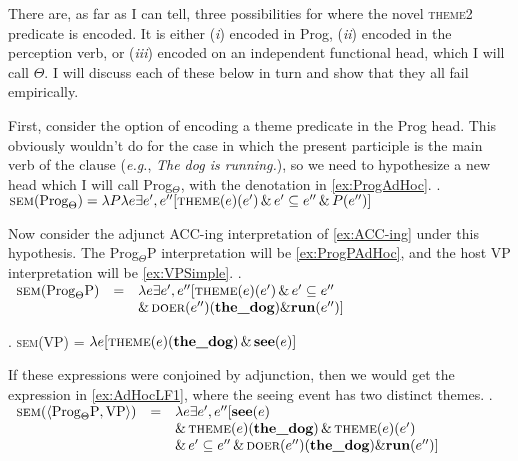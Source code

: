 There are, as far as I can tell, three possibilities for where the novel \textsc{theme2} predicate is encoded.
It is either (\textit{i}) encoded in Prog, (\textit{ii}) encoded in the perception verb, or (\textit{iii}) encoded on an independent functional head, which I will call $\Theta$.
I will discuss each of these below in turn and show that they all fail empirically.

First, consider the option of encoding a theme predicate in the Prog head.
This obviously wouldn't do for the case in which the present participle is the main verb of the clause (\textit{e.g.}, \textit{The dog is running.}), so we need to hypothesize a new head which I will call Prog$_{\Theta}$, with the denotation in \cref{ex:ProgAdHoc}.
\ex.\label{ex:ProgAdHoc} $\textsc{sem}(\text{Prog}_{\Theta}) = \lambda P \lambda e \exists e^{\prime},e^{\prime\prime}[\textsc{theme}(e)(e^{\prime}) \,\&\, e^{\prime}\subseteq e^{\prime\prime} \,\&\, P(e^{\prime\prime})]$

Now consider the adjunct ACC-ing interpretation of \cref{ex:ACC-ing} under this hypothesis.
The Prog$_{\Theta}$P interpretation will be \cref{ex:ProgPAdHoc}, and the host VP interpretation will be \cref{ex:VPSimple}.
\ex.\label{ex:ProgPAdHoc} $
\begin{array}[t]{rcl}
	\textsc{sem}(\text{Prog}_{\Theta}\text{P}) &=& \lambda e \exists e^{\prime},e^{\prime\prime}[\textsc{theme}(e)(e^{\prime}) \,\&\, e^{\prime}\subseteq e^{\prime\prime}\\
	& & \&\, \textsc{doer}(e^{\prime\prime})(\textbf{the\_dog}) \& \textbf{run}(e^{\prime\prime})]
\end{array}
$

\ex.\label{ex:VPSimple} \textsc{sem}(VP) = $\lambda e [\textsc{theme}(e)(\textbf{the\_dog}) \,\&\, \textbf{see}(e)]$

If these expressions were conjoined by adjunction, then we would get the expression in \cref{ex:AdHocLF1}, where the seeing event has two distinct themes.
\ex.\label{ex:AdHocLF1} $
\begin{array}[t]{rcl}
	\textsc{sem}(\langle \text{Prog}_{\Theta}\text{P}, \text{VP}\rangle) &=& \lambda e\exists e^{\prime},e^{\prime\prime}[\textbf{see}(e)\\
		& & \&\, \textsc{theme}(e)(\textbf{the\_dog}) \,\&\, \textsc{theme}(e)(e^{\prime})\\
	& & \&\, e^{\prime}\subseteq e^{\prime\prime} \,\&\, \textsc{doer}(e^{\prime\prime})(\textbf{the\_dog}) \& \textbf{run}(e^{\prime\prime})]
\end{array}
$

